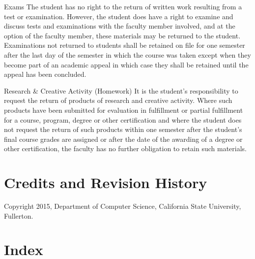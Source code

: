 \documentclass{book}
\begin{document}
Exams
The student has no right to the return of written work resulting from a test or examination. However, the student does have a right to examine and discuss tests and examinations with the faculty member involved, and at the option of the faculty member, these materials may be returned to the student. Examinations not returned to students shall be retained on file for one semester after the last day of the semester in which the course was taken except when they become part of an academic appeal in which case they shall be retained until the appeal has been concluded.

Research & Creative Activity (Homework)
It is the student's responsibility to request the return of products of research and creative activity. Where such products have been submitted for evaluation in fulfillment or partial fulfillment for a course, program, degree or other certification and where the student does not request the return of such products within one semester after the student's final course grades are assigned or after the date of the awarding of a degree or other certification, the faculty has no further obligation to retain such materials.

\chapter{Credits and Revision History}

Copyright 2015, Department of Computer Science, California State University, Fullerton.

\chapter{Index}
\printindex
\end{document}
